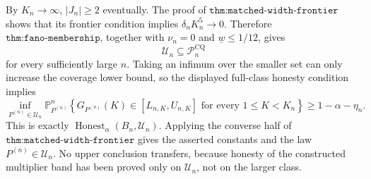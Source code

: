 By \(K_n\to\infty\), \(|J_n|\geq2\) eventually.  The proof of \(\texttt{thm:matched-width-frontier}\) shows that its frontier condition implies \(\delta_nK_n^5\to0\).  Therefore \(\texttt{thm:fano-membership}\), together with \(\nu_n=0\) and \(\underline w\leq1/12\), gives
\[
 \mathcal U_n\subseteq\mathcal P_n^{\mathrm{CQ}}
\]
for every sufficiently large \(n\).  Taking an infimum over the smaller set can only increase the coverage lower bound, so the displayed full-class honesty condition implies
\[
 \inf_{P^{(n)}\in\mathcal U_n}
 \mathbb P_{P^{(n)}}^n\!\left\{
 G_{P^{(n)}}(K)\in[L_{n,K},U_{n,K}]
 \text{ for every }1\leq K<K_n\right\}
 \geq1-\alpha-\eta_n.
\]
This is exactly \(\operatorname{Honest}_\alpha(B_n,\mathcal U_n)\).  Applying the converse half of \(\texttt{thm:matched-width-frontier}\) gives the asserted constants and the law \(P^{(n)}\in\mathcal U_n\).  No upper conclusion transfers, because honesty of the constructed multiplier band has been proved only on \(\mathcal U_n\), not on the larger class.
